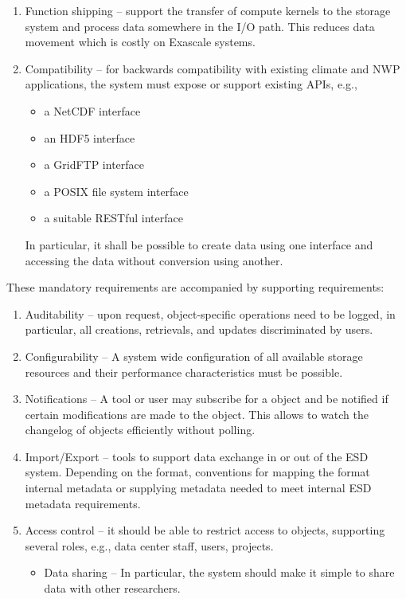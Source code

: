 \begin{enumerate}

\item Function shipping -- support the transfer of compute kernels to the storage system and process data somewhere in the I/O path. This reduces data movement which is costly on Exascale systems.

\item Compatibility -- for backwards compatibility with existing climate and NWP applications, the system must expose or support existing APIs, e.g.,
\begin{itemize}
\item a NetCDF interface
\item an HDF5 interface %
\item a GridFTP interface
\item a POSIX file system interface
\item a suitable RESTful interface
\end{itemize}
In particular, it shall be possible to create data using one interface and accessing the data without conversion using another.
\end{enumerate}



These mandatory requirements are accompanied by supporting requirements:
\begin{enumerate}
\item Auditability -- upon request, object-specific operations need to be logged, in particular, all creations, retrievals, and updates discriminated by users.
\item Configurability -- A system wide configuration of all available storage resources and their performance characteristics must be possible.
\item Notifications -- A tool or user may subscribe for a object and be notified if certain modifications are made to the object. This allows to watch the changelog of objects efficiently without polling.
\item Import/Export -- tools to support data exchange in or out of the ESD system.
Depending on the format, conventions for mapping the format internal metadata or supplying metadata needed to meet  internal ESD metadata requirements.
\item Access control -- it should be able to restrict access to objects, supporting several roles, e.g., data center staff, users, projects.
\begin{itemize}
\item Data sharing -- In particular, the system should make it simple to share data with other researchers.
\end{itemize}
\end{enumerate}



